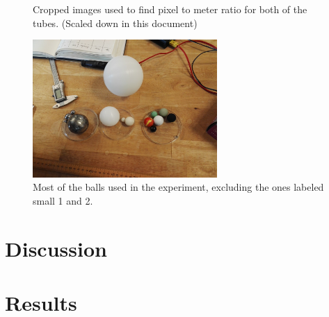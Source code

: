 \documentclass[11pt,a4paper]{article}
\begin{document}
\begin{multicols*}{2}
  \begin{figure}[H]
    \center

    \caption{Cropped images used to find pixel to meter ratio for both of the tubes. (Scaled down in this document)}
    \label{fig:scale1}
  \end{figure}

  \begin{figure}[H]
    \includegraphics[width=7cm]{scripts/figs/IMG_20180321_131204.jpg}
    \caption{Most of the balls used in the experiment, excluding the ones labeled small 1 and 2.}
  \end{figure}

\section{\label{sect:discuss}Discussion}

\section{\label{sect:results}Results}
  \end{multicols*}
\end{document}
